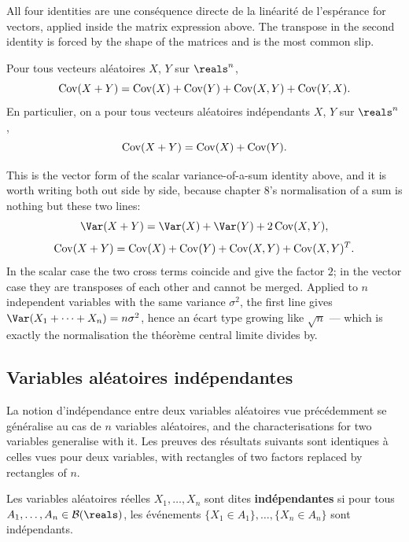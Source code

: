 \begin{remark}
  All four identities are une conséquence directe de la linéarité de l'espérance
  for vectors, applied inside the matrix expression above. The transpose in the
  second identity is forced by the shape of the matrices and is the most common
  slip.
\end{remark}

\begin{prop}
  Pour tous vecteurs aléatoires $X$, $Y$ sur $\reals^{n}$,
  \[
    \operatorname{Cov}(X+Y) = \operatorname{Cov}(X) + \operatorname{Cov}(Y) + \operatorname{Cov}(X,Y) + \operatorname{Cov}(Y,X).
  \]
  En particulier, on a pour tous vecteurs aléatoires indépendants $X$, $Y$ sur
  $\reals^{n}$,
  \[
    \operatorname{Cov}(X+Y) = \operatorname{Cov}(X) + \operatorname{Cov}(Y).
  \]
\end{prop}

This is the vector form of the scalar variance-of-a-sum identity above, and it
is worth writing both
out side by side, because chapter 8's normalisation of a sum is nothing but these
two lines:
\[
  \Var(X+Y) = \Var(X) + \Var(Y) + 2\Cov(X,Y),
\]
\[
  \operatorname{Cov}(X+Y) = \operatorname{Cov}(X) + \operatorname{Cov}(Y) + \operatorname{Cov}(X,Y) + \operatorname{Cov}(X,Y)^{T} .
\]
In the scalar case the two cross terms coincide and give the factor $2$; in the
vector case they are transposes of each other and cannot be merged. Applied to
$n$ independent variables with the same variance $\sigma^{2}$, the first line
gives $\Var(X_{1}+\dots+X_{n}) = n\sigma^{2}$, hence an écart type growing like
$\sqrt{n}$ --- which is exactly the normalisation the théorème central limite
divides by.

\subsection{Variables aléatoires indépendantes}

La notion d'indépendance entre deux variables aléatoires vue précédemment se
généralise au cas de $n$ variables aléatoires, and the characterisations for two
variables generalise with it. Les preuves des résultats suivants sont identiques
à celles vues pour deux variables, with rectangles of two factors replaced by
rectangles of $n$.

\begin{definition}
  Les variables aléatoires réelles $X_{1},\dots,X_{n}$ sont dites
  \textbf{indépendantes} si pour tous $A_{1},\dots,A_{n} \in \mathcal{B}(\reals)$,
  les événements $\{X_{1} \in A_{1}\},\dots,\{X_{n} \in A_{n}\}$ sont
  indépendants.
\end{definition}

